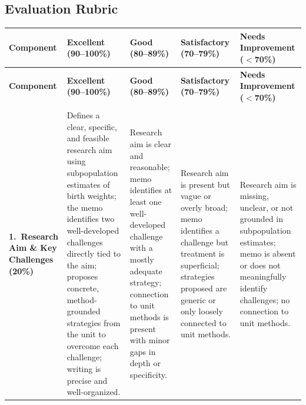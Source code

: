 
\begin{landscape}

    \section{Evaluation Rubric}

    {\footnotesize

    \begin{longtable}{%
        >{\RaggedRight\arraybackslash}p{2.5cm}   %
        >{\RaggedRight\arraybackslash}p{4.5cm}   %
        >{\RaggedRight\arraybackslash}p{4.2cm}   %
        >{\RaggedRight\arraybackslash}p{4.2cm}   %
        >{\RaggedRight\arraybackslash}p{4.5cm}}  %

    \toprule
    \textbf{Component} &
    \textbf{Excellent (90--100\%)} &
    \textbf{Good (80--89\%)} &
    \textbf{Satisfactory (70--79\%)} &
    \textbf{Needs Improvement ($<$70\%)} \\
    \midrule
    \endfirsthead

    \toprule
    \textbf{Component} &
    \textbf{Excellent (90--100\%)} &
    \textbf{Good (80--89\%)} &
    \textbf{Satisfactory (70--79\%)} &
    \textbf{Needs Improvement ($<$70\%)} \\
    \midrule
    \endhead

    \midrule
    \multicolumn{5}{r}{\textit{Continued on next page}} \\
    \endfoot

    \bottomrule
    \endlastfoot

    \textbf{1.\ Research Aim \& Key Challenges}
    \newline\textbf{(20\%)}
    &
    Defines a clear, specific, and feasible research aim using
    subpopulation estimates of birth weights; the memo identifies two
    well-developed challenges directly tied to the aim; proposes
    concrete, method-grounded strategies from the unit to overcome
    each challenge; writing is precise and well-organized.
    &
    Research aim is clear and reasonable; memo identifies at least
    one well-developed challenge with a mostly adequate strategy;
    connection to unit methods is present with minor gaps in depth
    or specificity.
    &
    Research aim is present but vague or overly broad; memo identifies
    a challenge but treatment is superficial; strategies proposed are
    generic or only loosely connected to unit methods.
    &
    Research aim is missing, unclear, or not grounded in subpopulation
    estimates; memo is absent or does not meaningfully identify
    challenges; no connection to unit methods.
    \\
    \midrule


\end{longtable}}
\end{landscape}
